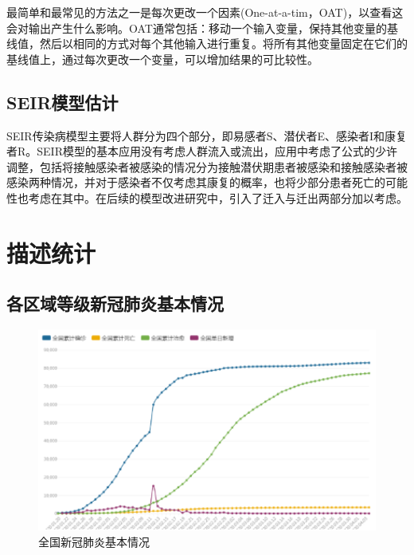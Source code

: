 \documentclass[12pt,hyperref,]{ctexart}
\begin{document}
最简单和最常见的方法之一是每次更改一个因素(One-at-a-tim，OAT)，以查看这会对输出产生什么影响。OAT通常包括：移动一个输入变量，保持其他变量的基线值，然后以相同的方式对每个其他输入进行重复。将所有其他变量固定在它们的基线值上，通过每次更改一个变量，可以增加结果的可比较性。

\hypertarget{seirux6a21ux578bux4f30ux8ba1}{%
\subsection{SEIR模型估计}\label{seirux6a21ux578bux4f30ux8ba1}}

SEIR传染病模型主要将人群分为四个部分，即易感者S、潜伏者E、感染者I和康复者R。SEIR模型的基本应用没有考虑人群流入或流出，应用中考虑了公式的少许调整，包括将接触感染者被感染的情况分为接触潜伏期患者被感染和接触感染者被感染两种情况，并对于感染者不仅考虑其康复的概率，也将少部分患者死亡的可能性也考虑在其中。在后续的模型改进研究中，引入了迁入与迁出两部分加以考虑。

\hypertarget{ux63cfux8ff0ux7edfux8ba1}{%
\section{描述统计}\label{ux63cfux8ff0ux7edfux8ba1}}

\hypertarget{ux5404ux533aux57dfux7b49ux7ea7ux65b0ux51a0ux80baux708eux57faux672cux60c5ux51b5}{%
\subsection{各区域等级新冠肺炎基本情况}\label{ux5404ux533aux57dfux7b49ux7ea7ux65b0ux51a0ux80baux708eux57faux672cux60c5ux51b5}}

\begin{figure}
\includegraphics[width=5.56in]{image/3.1.1} \caption{全国新冠肺炎基本情况}\label{fig:3.1}
\end{figure}
\end{document}
